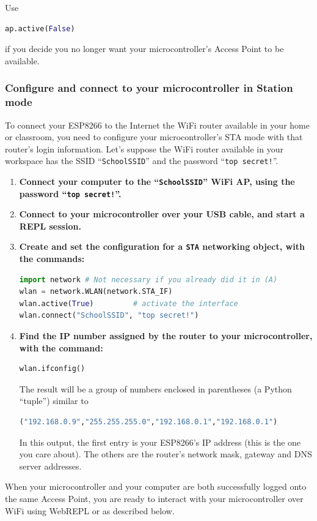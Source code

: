 Use
\begin{lstlisting}[language=Python]
ap.active(False)
\end{lstlisting}
if you decide you no longer want your microcontroller's Access Point to be available.

\subsubsection{\howto Configure and connect to your microcontroller in Station mode}
To connect your ESP8266 to the Internet the WiFi router available in your home or classroom, you need to configure your microcontroller's STA mode with that router's login information.
Let's suppose the WiFi router available in your workspace has the SSID ``\texttt{SchoolSSID}'' and the password ``\texttt{top secret!}''.
\begin{enumerate}
	\item \textbf{Connect your computer to the ``\texttt{SchoolSSID}'' WiFi AP, using the password ``\texttt{top secret!}''.}
	\item \textbf{Connect to your microcontroller over your USB cable, and start a REPL session.}
	\item \textbf{Create and set the configuration for a \texttt{STA} networking object, with the commands:}
\begin{lstlisting}[language=Python]
import network # Not necessary if you already did it in (A)
wlan = network.WLAN(network.STA_IF)
wlan.active(True)         # activate the interface
wlan.connect("SchoolSSID", "top secret!")
\end{lstlisting}
	\item \textbf{Find the IP number assigned by the router to your microcontroller, with the command:}
\begin{lstlisting}[language=Python]
wlan.ifconfig()
\end{lstlisting}
	The result will be a group of numbers enclosed in parentheses (a Python ``tuple'') similar to
\begin{lstlisting}[language=Python]
("192.168.0.9","255.255.255.0","192.168.0.1","192.168.0.1")
\end{lstlisting}
	In this output, the first entry is your ESP8266’s IP address (this is the one you care about).
	The others are the router’s network mask, gateway and DNS server addresses.
\end{enumerate}
When your microcontroller and your computer are both successfully logged onto the same Access Point, you are ready to interact with your microcontroller over WiFi using WebREPL or \mpfshell as described below.

